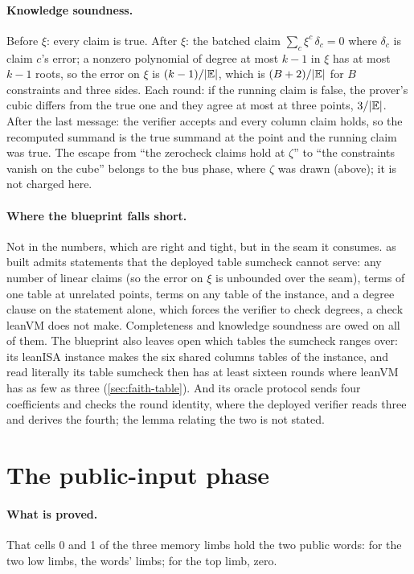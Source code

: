 \paragraph{Knowledge soundness.} Before $\xi$: every claim is true. After $\xi$: the batched
claim $\sum_c \xi^c\, \delta_c = 0$ where $\delta_c$ is claim $c$'s error; a nonzero polynomial
of degree at most $k - 1$ in $\xi$ has at most $k - 1$ roots, so the error on $\xi$ is
$(k - 1) / \lvert \mathbb{E}\rvert$, which is $(B + 2) / \lvert \mathbb{E}\rvert$ for $B$ constraints and three sides. Each
round: if the running claim is false, the prover's cubic differs from the true one and they
agree at most at three points, $3 / \lvert \mathbb{E}\rvert$. After the last message: the verifier accepts and
every column claim holds, so the recomputed summand is the true summand at the point and the
running claim was true. The escape from \enquote{the zerocheck claims hold at $\zeta$} to
\enquote{the constraints vanish on the cube} belongs to the bus phase, where $\zeta$ was drawn
(above); it is not charged here.

\paragraph{Where the blueprint falls short.} Not in the numbers, which are right and tight,
but in the seam it consumes.  as built admits statements that the deployed table
sumcheck cannot serve: any number of linear claims (so the error on $\xi$ is unbounded over the
seam), terms of one table at unrelated points, terms on any table of the instance, and a degree
clause on the statement alone, which forces the verifier to check degrees, a check leanVM does
not make. Completeness and knowledge soundness are owed on all of them. The blueprint also
leaves open which tables the sumcheck ranges over: its leanISA instance makes the six shared
columns tables of the instance, and read literally its table sumcheck then has at least sixteen
rounds where leanVM has as few as three (\cref{sec:faith-table}). And its oracle protocol sends
four coefficients and checks the round identity, where the deployed verifier reads three and
derives the fourth; the lemma relating the two is not stated.

\section{The public-input phase}\label{sec:ph-pub}

\paragraph{What is proved.} That cells 0 and 1 of the three memory limbs hold the two public
words: for the two low limbs, the words' limbs; for the top limb, zero.

